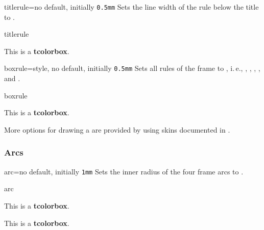 \clearpage
\begin{docTcbKey}{titlerule}{=}{no default, initially \texttt{0.5mm}}
  Sets the line width of the rule below the title to .
\begin{exdispExample}{titlerule}

\begin{tcolorbox}[titlerule=3mm,title=This is the title]
This is a \textbf{tcolorbox}.
\end{tcolorbox}
\end{exdispExample}
\end{docTcbKey}


\begin{docTcbKey}{boxrule}{=}{style, no default, initially \texttt{0.5mm}}
  Sets all rules of the frame to , i.\,e.,
  , , ,
  , and .
\begin{exdispExample}{boxrule}

\begin{tcolorbox}[boxrule=3mm]
This is a \textbf{tcolorbox}.
\end{tcolorbox}
\end{exdispExample}
\end{docTcbKey}

\bigskip
\begin{marker}
  More options for drawing a  are provided by using skins documented in
  .
\end{marker}


\subsubsection{Arcs}
\begin{docTcbKey}{arc}{=}{no default, initially \texttt{1mm}}
  Sets the inner radius of the four frame arcs to .
\begin{exdispExample}{arc}

\begin{tcolorbox}[arc=0mm]
This is a \textbf{tcolorbox}.
\end{tcolorbox}
\begin{tcolorbox}[arc=3mm]
This is a \textbf{tcolorbox}.
\end{tcolorbox}
\end{exdispExample}
\end{docTcbKey}


